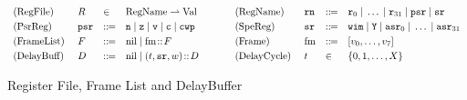 \begin{figure}[!t]
	\small
	\[
		\begin{array}{llllcllll}
			\TYPE{(RegFile)} & \RFile & \in & 
			\TYPE{RegName} \rightharpoonup \TYPE{Val}
         & \quad \ \ &
        \TYPE{(RegName)} & \regN & \define &
		 \reg{0} \sepline \dots \sepline \reg{31} \sepline \psr \sepline \sr \\
		 \\[-9pt]
		
		\TYPE{(PsrReg)} & \psr & \define &
		\regn \sepline
			\regz \sepline
			\regv \sepline
			\regc \sepline \regcwp & \quad &
		\TYPE{(SpeReg)} & \sr & \define &
		\regwim \sepline
			\regY \sepline
\asr_0 \sepline \dots \sepline \asr_{31} \\ \\[-9pt]
		
		\TYPE{(FrameList)} \  & \Wstack & \define &
            \nil \sepline \fm \stCons \Wstack & \quad &
		\TYPE{(Frame)} & \fm & \define & [\val_0, \dots, \val_7] 
		\\ \\[-9pt]
		
		\TYPE{(DelayBuff)} & \DBuf & \define & \nil \sepline
                                  (\tick, \sr, \word) \dbCons \DBuf
                                  & \quad
		& \TYPE{(DelayCycle)} \ & \tick & \in & \{ 0, 1, \dots, X \}
		\end{array}
	\]

		
		
		
	\caption{Register File, Frame List and DelayBuffer}
	\label{fig:Register File and Frame List}
\end{figure}

